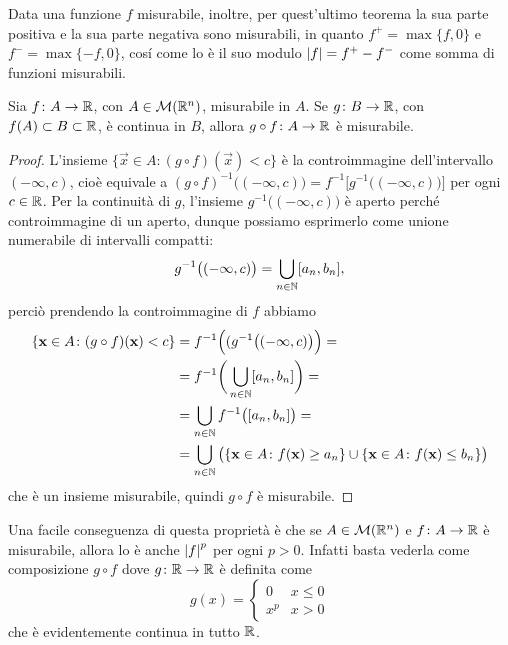 Data una funzione $f$ misurabile, inoltre, per quest'ultimo teorema la sua parte positiva e la sua parte negativa sono misurabili, in quanto $f^+=\max\{f,0\}$ e $f^-=\max\{-f,0\}$, cos\'i come lo è il suo modulo $\left|{f}\right|=f^+-f^-$ come somma di funzioni misurabili.
\begin{proprieta} \label{pr:composizione-funzioni-misurabili}
	Sia $f\colon A\to\mathbb{R}$, con $A\in\mathcal M(\mathbb{R}^n)$, misurabile in $A$.
	Se $g\colon B\to\mathbb{R}$, con $f(A)\subset B\subset\mathbb{R}$, è continua in $B$, allora $g\circ f\colon A\to\mathbb{R}$ è misurabile.
\end{proprieta}
\begin{proof}
	L'insieme $\{\vec x\in A\colon (g\circ f)(\vec x)<c\}$ è la controimmagine dell'intervallo $(-\infty,c)$, cioè equivale a $(g\circ f)^{-1}\big( (-\infty,c)\big)=f^{-1}\big[g^{-1}\big((-\infty,c)\big)\big]$ per ogni $c\in\mathbb{R}$.
	Per la continuità di $g$, l'insieme $g^{-1}\big( (-\infty,c)\big)$ è aperto perch\'e controimmagine di un aperto, dunque possiamo esprimerlo come unione numerabile di intervalli compatti:
	\begin{equation}
		g^{-1}\big( (-\infty,c)\big)=\bigcup_{n\in\mathbb{N}}[a_n,b_n],
	\end{equation}
	perciò prendendo la controimmagine di $f$ abbiamo
	\begin{equation}
		\begin{split}
			\{\mathbf{x}\in A\colon (g\circ f)(\mathbf{x})<c\}&=f^{-1}\Big((g^{-1}\big( (-\infty,c)\big)\Big)=\\
			&=f^{-1}\bigg(\bigcup_{n\in\mathbb{N}}[a_n,b_n]\bigg)=\\
			&=\bigcup_{n\in\mathbb{N}}f^{-1}\big([a_n,b_n]\big)=\\
			&=\bigcup_{n\in\mathbb{N}}\big(\{\mathbf{x}\in A\colon f(\mathbf{x})\geq a_n\}\cup\{\mathbf{x}\in A\colon f(\mathbf{x})\leq b_n\}\big)
		\end{split}
	\end{equation}
	che è un insieme misurabile, quindi $g\circ f$ è misurabile.
\end{proof}
Una facile conseguenza di questa proprietà è che se $A\in\mathcal M(\mathbb{R}^n)$ e $f\colon A\to\mathbb{R}$ è misurabile, allora lo è anche $\left|{f}\right|^p$ per ogni $p>0$.
Infatti basta vederla come composizione $g\circ f$ dove $g\colon\mathbb{R}\to\mathbb{R}$ è definita come
\begin{equation}
	g(x)=
	\begin{cases}
		0&x\leq 0\\
		x^p&x>0
	\end{cases}
\end{equation}
che è evidentemente continua in tutto $\mathbb{R}$.
